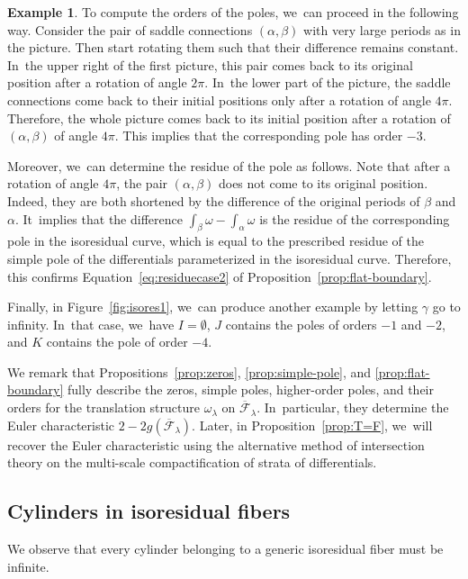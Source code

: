 \documentclass[JEP,XML,SOM,Unicode,NoFloatCountersInSection,published]{cedram}
\theoremstyle{definition}
\newtheorem{ex}[thm]{Example}
\begin{document}
\begin{ex}
To compute the orders of the poles, we~can proceed in the following way. Consider the pair of saddle connections $(\alpha,\beta)$ with very large periods as in the picture. Then start rotating them such that their difference remains constant. In~the upper right of the first picture, this pair comes back to its original position after a rotation of angle $2\pi$. In~the lower part of the picture, the saddle connections come back to their initial positions only after a rotation of angle $4\pi$. Therefore, the whole picture comes back to its initial position after a rotation of $(\alpha,\beta)$ of angle $4\pi$. This implies that the corresponding pole has order $-3$.

Moreover, we~can determine the residue of the pole as follows. Note that after a rotation of angle $4\pi$, the pair $(\alpha,\beta)$ does not come to its original position. Indeed, they are both shortened by the difference of the original periods of $\beta$ and $\alpha$. It~implies that the difference $\int_{\beta}\omega -\int_{\alpha}\omega$
is the residue of the corresponding pole in the isoresidual curve, which is equal to the prescribed residue of the simple pole of the differentials parameterized in the isoresidual curve. Therefore, this confirms Equation~\eqref{eq:residuecase2} of Proposition~\ref{prop:flat-boundary}.

Finally, in Figure~\ref{fig:isores1}, we~can produce another example by letting $\gamma$ go to infinity. In~that case, we~have $I=\emptyset$, $J$ contains the poles of orders $-1$ and $-2$, and $K$ contains the pole of order $-4$.
\end{ex}

We remark that Propositions~\ref{prop:zeros}, \ref{prop:simple-pole}, and \ref{prop:flat-boundary} fully describe the zeros, simple poles, higher-order poles, and their orders for the translation structure $\omega_\lambda$ on $\overline{\mathcal{F}}_{\lambda}$. In~particular, they determine the Euler characteristic $2-2g(\overline{\mathcal{F}}_{\lambda})$. Later, in Proposition~\ref{prop:T=F}, we~will recover the Euler characteristic using the alternative method of intersection theory on the multi-scale compactification of strata of differentials.

\subsection{Cylinders in isoresidual fibers}\label{sub:cylinders}

We observe that every cylinder belonging to a generic isoresidual fiber must be infinite.
\end{document}
